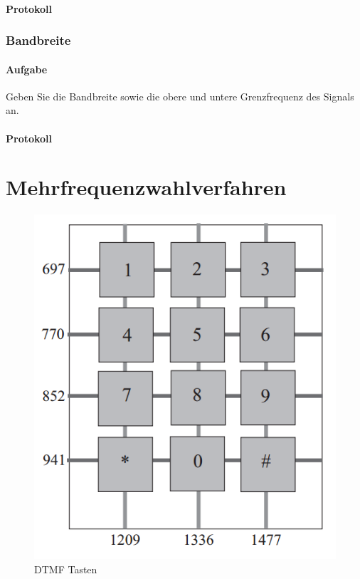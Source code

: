 \documentclass[10pt]{report}
\begin{document}
        \paragraph{Protokoll}

        \subsubsection{Bandbreite}
        \paragraph{Aufgabe}
        Geben Sie die Bandbreite sowie die obere und untere Grenzfrequenz des Signals an.
        \paragraph{Protokoll}

        \section{Mehrfrequenzwahlverfahren}
        \begin{center}
            \begin{figure}[H]
                \includegraphics[width=\textwidth]{dtmf_pad.jpg}
                \caption{DTMF Tasten}
            \end{figure}
        \end{center}
\end{document}
